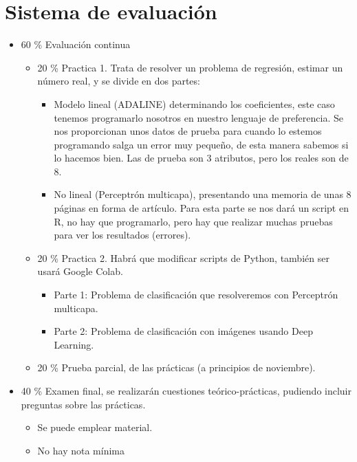 \documentclass[12pt, twoside, openright]{report} %
\begin{document}
\section{Sistema de evaluación}
\begin{itemize}
	\item 60 \% Evaluación continua
	      \begin{itemize}
		      \item 20 \% Practica 1. Trata de resolver un problema de regresión, estimar un número real, y se divide en dos partes:
		            \begin{itemize}
			            \item  Modelo lineal (ADALINE) determinando los coeficientes, este caso tenemos programarlo nosotros en nuestro lenguaje de preferencia.
			                  Se nos proporcionan unos datos de prueba para cuando lo estemos programando salga un error muy pequeño, de esta manera sabemos si lo hacemos bien. Las de prueba son 3 atributos, pero los reales son de 8.
			            \item  No lineal (Perceptrón multicapa), presentando una memoria de unas 8 páginas en forma de artículo.
			                  Para esta parte se nos dará un script en R, no hay que programarlo, pero hay que realizar muchas pruebas para ver los resultados (errores).
		            \end{itemize}
		      \item 20 \% Practica 2. Habrá que modificar scripts de Python, también ser usará Google Colab.
		            \begin{itemize}
			            \item Parte 1: Problema de clasificación que resolveremos con Perceptrón multicapa.
			            \item Parte 2: Problema de clasificación con imágenes usando Deep Learning.
		            \end{itemize}
		      \item 20 \% Prueba parcial, de las prácticas (a principios de noviembre).
	      \end{itemize}
	\item 40 \% Examen final, se realizarán cuestiones teórico-prácticas, pudiendo incluir preguntas sobre las prácticas.
	      \begin{itemize}
		      \item Se puede emplear material.
		      \item No hay nota mínima
	      \end{itemize}
\end{itemize}
\end{document}
